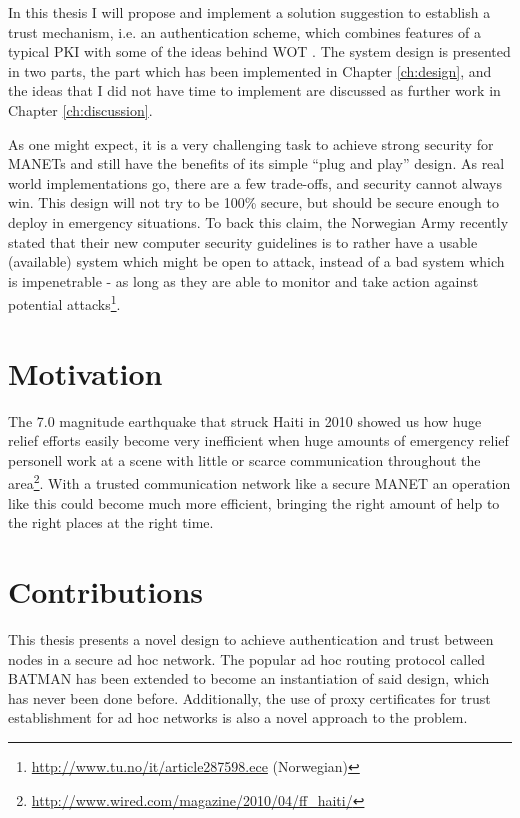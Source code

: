 In this thesis I will propose and implement a solution suggestion to establish a
trust mechanism, i.e. an authentication scheme, which combines features of a
typical \ac{PKI} with some of the ideas behind \ac{WOT}
\cite{zimmermann1995official}. The system design is presented in two parts, the
part which has been implemented in Chapter \ref{ch:design}, and the ideas that I
did not have time to implement are discussed as further work in Chapter
\ref{ch:discussion}.

As one might expect, it is a very challenging task to achieve strong security
for \acp{MANET} and still have the benefits of its simple ``plug and play''
design. As real world implementations go, there are a few trade-offs, and
security cannot always win. This design will not try to be 100\% secure, but
should be secure enough to deploy in emergency situations. To back this claim,
the Norwegian Army recently stated that their new computer security guidelines
is to rather have a usable (available) system which might be open to attack,
instead of a bad system which is impenetrable - as long as they are able to
monitor and take action against potential
attacks\footnote{\url{http://www.tu.no/it/article287598.ece} (Norwegian)}.

\section{Motivation}
The 7.0 magnitude earthquake that struck Haiti in 2010 showed us how huge
relief efforts easily become very inefficient when huge amounts of emergency
relief personell work at a scene with little or scarce communication throughout
the area\footnote{\url{http://www.wired.com/magazine/2010/04/ff_haiti/}}. With
a trusted communication network like a secure \ac{MANET} an operation like this
could become much more efficient, bringing the right amount of help to the
right places at the right time.

\section{Contributions}
This thesis presents a novel design to achieve authentication and trust
between nodes in a secure ad hoc network. The popular ad hoc routing protocol
called BATMAN has been extended to become an instantiation of said design, which
has never been done before. Additionally, the use of proxy certificates for
trust establishment for ad hoc networks is also a novel approach to the problem.


